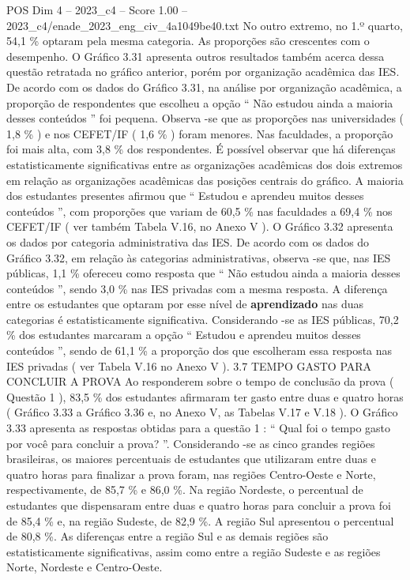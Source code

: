 \begin{textsample}{POS Dim 4 – 2023\_c4 – Score 1.00 – 2023\_c4/enade\_2023\_eng\_civ\_4a1049be40.txt}
No outro extremo, no 1.º quarto, 54,1 \% optaram pela mesma categoria.
As proporções são crescentes com o desempenho.
O Gráfico 3.31 apresenta outros resultados também acerca dessa questão retratada no gráfico anterior, porém por organização acadêmica das IES.
De acordo com os dados do Gráfico 3.31, na análise por organização acadêmica, a proporção de respondentes que escolheu a opção “ Não estudou ainda a maioria desses conteúdos ” foi pequena.
Observa -se que as proporções nas universidades ( 1,8 \% ) e nos CEFET/IF ( 1,6 \% ) foram menores.
Nas faculdades, a proporção foi mais alta, com 3,8 \% dos respondentes.
É possível observar que há diferenças estatisticamente significativas entre as organizações acadêmicas dos dois extremos em relação as organizações acadêmicas das posições centrais do gráfico.
A maioria dos estudantes presentes afirmou que “ Estudou e aprendeu muitos desses conteúdos ”, com proporções que variam de 60,5 \% nas faculdades a 69,4 \% nos CEFET/IF ( ver também Tabela V.16, no Anexo V ).
O Gráfico 3.32 apresenta os dados por categoria administrativa das IES.
De acordo com os dados do Gráfico 3.32, em relação às categorias administrativas, observa -se que, nas IES públicas, 1,1 \% ofereceu como resposta que “ Não estudou ainda a maioria desses conteúdos ”, sendo 3,0 \% nas IES privadas com a mesma resposta.
A diferença entre os estudantes que optaram por esse nível de \textbf{aprendizado} nas duas categorias é estatisticamente significativa.
Considerando -se as IES públicas, 70,2 \% dos estudantes marcaram a opção “ Estudou e aprendeu muitos desses conteúdos ”, sendo de 61,1 \% a proporção dos que escolheram essa resposta nas IES privadas ( ver Tabela V.16 no Anexo V ). 3.7 TEMPO GASTO PARA CONCLUIR A PROVA Ao responderem sobre o tempo de conclusão da prova ( Questão 1 ), 83,5 \% dos estudantes afirmaram ter gasto entre duas e quatro horas ( Gráfico 3.33 a Gráfico 3.36 e, no Anexo V, as Tabelas V.17 e V.18 ).
O Gráfico 3.33 apresenta as respostas obtidas para a questão 1 : “ Qual foi o tempo gasto por você para concluir a prova? ”.
Considerando -se as cinco grandes regiões brasileiras, os maiores percentuais de estudantes que utilizaram entre duas e quatro horas para finalizar a prova foram, nas regiões Centro-Oeste e Norte, respectivamente, de 85,7 \% e 86,0 \%.
Na região Nordeste, o percentual de estudantes que dispensaram entre duas e quatro horas para concluir a prova foi de 85,4 \% e, na região Sudeste, de 82,9 \%.
A região Sul apresentou o percentual de 80,8 \%.
As diferenças entre a região Sul e as demais regiões são estatisticamente significativas, assim como entre a região Sudeste e as regiões Norte, Nordeste e Centro-Oeste.

\end{textsample}
